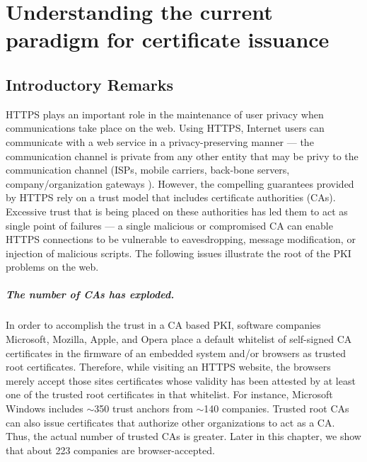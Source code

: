 \chapter{Understanding the current paradigm for certificate issuance }
\label{chap:Understanding domain validation practices}


\section{Introductory Remarks}\label{sec:chap3Intro} 

HTTPS plays an important role in the maintenance of user privacy when communications take place on the web. Using HTTPS, Internet users can communicate with a web service in a privacy-preserving manner --- \ie the communication channel is private from any other entity that may be privy to the communication channel (\eg ISPs, mobile carriers, back-bone servers, company/organization gateways \etc ). However, the compelling guarantees provided by HTTPS rely on a trust model that includes certificate authorities (CAs). Excessive trust that is being placed on these authorities has led them to act as single point of failures --- a single malicious or compromised CA can enable HTTPS connections to be vulnerable to eavesdropping, message modification, or injection of malicious scripts. The following issues illustrate the root of the PKI problems on the web. 

\paragraph{The number of CAs has exploded.} In order to accomplish the trust in a CA based PKI, software companies \eg Microsoft, Mozilla, Apple, and Opera place a default whitelist of self-signed CA certificates in the firmware of an embedded system and/or browsers as trusted root certificates. Therefore, while visiting an HTTPS website, the browsers merely accept those sites certificates whose validity has been attested by at least one of the trusted root certificates in that whitelist. For instance, Microsoft Windows includes ${\sim}$350 trust anchors from ${\sim}$140 companies. Trusted root CAs can also issue certificates that authorize other organizations to act as a CA. Thus, the actual number of trusted CAs is greater. Later in this chapter, we show that about 223 companies are browser-accepted.

